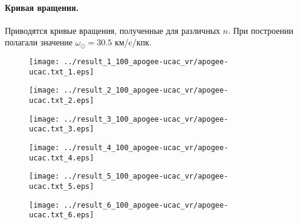 \documentclass{matmex-diploma-custom}
\begin{document}
\pagebreak
\paragraph{Кривая вращения.} Приводятся кривые вращения, полученные для различных $n$. При построении полагали значение $\omega_{\odot} = 30.5$ км/c/кпк.
\begin{figure}[h!]
\begin{minipage}[h]{0.49\linewidth}
        \texttt{[image: ../result\_1\_100\_apogee-ucac\_vr/apogee-ucac.txt\_1.eps]}
\end{minipage}
\hfill
\begin{minipage}[h]{0.49\linewidth}
        \texttt{[image: ../result\_2\_100\_apogee-ucac\_vr/apogee-ucac.txt\_2.eps]}
\end{minipage}
\end{figure}
\begin{figure}[h!]
\begin{minipage}[h]{0.49\linewidth}
        \texttt{[image: ../result\_3\_100\_apogee-ucac\_vr/apogee-ucac.txt\_3.eps]}
\end{minipage}
\hfill
\begin{minipage}[h]{0.49\linewidth}
        \texttt{[image: ../result\_4\_100\_apogee-ucac\_vr/apogee-ucac.txt\_4.eps]}
\end{minipage}
\end{figure}
\begin{figure}[h!]
\begin{minipage}[h]{0.49\linewidth}
        \texttt{[image: ../result\_5\_100\_apogee-ucac\_vr/apogee-ucac.txt\_5.eps]}
\end{minipage}
\hfill
\begin{minipage}[h]{0.49\linewidth}
        \texttt{[image: ../result\_6\_100\_apogee-ucac\_vr/apogee-ucac.txt\_6.eps]}
\end{minipage}
\end{figure}


\pagebreak
\end{document}
